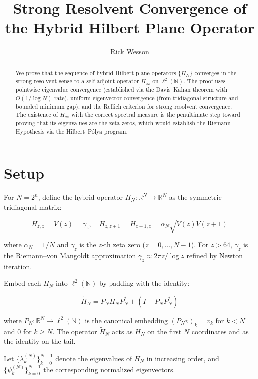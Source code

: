 \documentclass[11pt,a4paper]{article}
\title{\bf Strong Resolvent Convergence of the Hybrid Hilbert Plane Operator}
\author{Rick Wesson}
\date{}
\begin{document}
\maketitle

\begin{abstract}
We prove that the sequence of hybrid Hilbert plane operators $\{H_N\}$
converges in the strong resolvent sense to a self-adjoint operator
$H_\infty$ on $\ell^2(\mathbb{N})$. The proof uses pointwise eigenvalue
convergence (established via the Davis--Kahan theorem with $O(1/\log N)$
rate), uniform eigenvector convergence (from tridiagonal structure and
bounded minimum gap), and the Rellich criterion for strong resolvent
convergence. The existence of $H_\infty$ with the correct spectral
measure is the penultimate step toward proving that its eigenvalues
are the zeta zeros, which would establish the Riemann Hypothesis via
the Hilbert--P\'{o}lya program.
\end{abstract}

\section{Setup}

For $N = 2^n$, define the hybrid operator $H_N: \mathbb{R}^N \to
\mathbb{R}^N$ as the symmetric tridiagonal matrix:

\begin{equation}\label{eq:op}
H_{z,z} = V(z) = \gamma_z, \quad
H_{z,z+1} = H_{z+1,z} = \alpha_N\sqrt{V(z)V(z+1)}
\end{equation}

where $\alpha_N = 1/N$ and $\gamma_z$ is the $z$-th zeta zero
($z = 0,\ldots,N-1$). For $z > 64$, $\gamma_z$ is the Riemann--von
Mangoldt approximation $\gamma_z \approx 2\pi z/\log z$ refined by
Newton iteration.

Embed each $H_N$ into $\ell^2(\mathbb{N})$ by padding with the identity:

\begin{equation}\label{eq:embed}
\widetilde{H}_N = P_N H_N P_N^* + (I - P_N P_N^*)
\end{equation}

where $P_N: \mathbb{R}^N \to \ell^2(\mathbb{N})$ is the canonical
embedding $(P_N v)_k = v_k$ for $k < N$ and $0$ for $k \geq N$.
The operator $\widetilde{H}_N$ acts as $H_N$ on the first $N$
coordinates and as the identity on the tail.

Let $\{\lambda_k^{(N)}\}_{k=0}^{N-1}$ denote the eigenvalues of $H_N$
in increasing order, and $\{\psi_k^{(N)}\}_{k=0}^{N-1}$ the
corresponding normalized eigenvectors.
\end{document}
